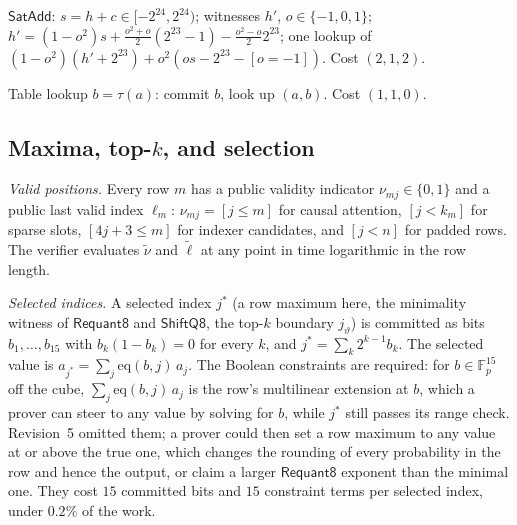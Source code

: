 \documentclass[11pt]{article}
\newcommand{\F}{\mathbb{F}}
\newcommand{\Fp}{\F_p}
\begin{document}
\(\mathsf{SatAdd}\): \(s = h + c \in [-2^{24}, 2^{24})\); witnesses \(h'\), \(o \in \{-1,0,1\}\);
\(h' = (1 - o^2) s + \tfrac{o^2+o}{2}(2^{23}-1) - \tfrac{o^2-o}{2} 2^{23}\);
one lookup of \((1-o^2)(h' + 2^{23}) + o^2(o s - 2^{23} - [o=-1])\).
Cost \((2, 1, 2)\).

Table lookup \(b = \tau(a)\): commit \(b\), look up \((a, b)\). Cost \((1,1,0)\).

\subsection{Maxima, top-\texorpdfstring{\(k\)}{k}, and selection}
\label{sec:g-max}

\emph{Valid positions.}
Every row \(m\) has a public validity indicator \(\nu_{mj} \in \{0,1\}\) and a public last valid index \(\ell_m\): \(\nu_{mj} = [j \le m]\) for causal attention, \([j < k_m]\) for sparse slots, \([4j + 3 \le m]\) for indexer candidates, and \([j < n]\) for padded rows.
The verifier evaluates \(\tilde\nu\) and \(\tilde\ell\) at any point in time logarithmic in the row length.

\emph{Selected indices.}
A selected index \(j^\ast\) (a row maximum here, the minimality witness of \(\mathsf{Requant8}\) and \(\mathsf{ShiftQ8}\), the top-\(k\) boundary \(j_\vartheta\)) is committed as bits \(b_1, \ldots, b_{15}\) with \(b_k(1 - b_k) = 0\) for every \(k\), and \(j^\ast = \sum_k 2^{k-1} b_k\).
The selected value is \(a_{j^\ast} = \sum_j \mathrm{eq}(b, j)\, a_j\).
The Boolean constraints are required: for \(b \in \Fp^{15}\) off the cube, \(\sum_j \mathrm{eq}(b, j)\, a_j\) is the row's multilinear extension at \(b\), which a prover can steer to any value by solving for \(b\), while \(j^\ast\) still passes its range check.
Revision~5 omitted them; a prover could then set a row maximum to any value at or above the true one, which changes the rounding of every probability in the row and hence the output, or claim a larger \(\mathsf{Requant8}\) exponent than the minimal one.
They cost \(15\) committed bits and \(15\) constraint terms per selected index, under \(0.2\%\) of the work.
\end{document}
